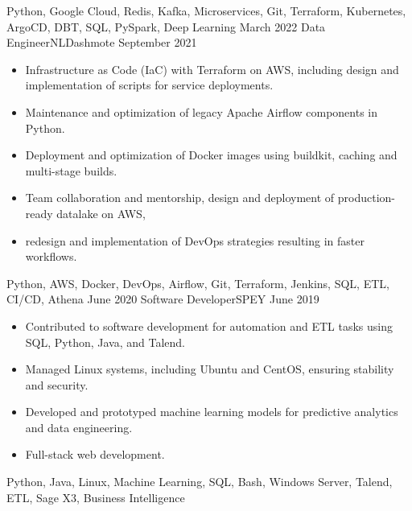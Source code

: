 \begin{experiences}
{\begin{itemize}
    \end{itemize}
  }
  {Python, Google Cloud, Redis, Kafka, Microservices, Git, Terraform, Kubernetes, ArgoCD, DBT, SQL, PySpark, Deep Learning}
  \emptySeparator
  \experience
  {March 2022}   {Data Engineer}{NL}{Dashmote}
  {September 2021} {
    \begin{itemize}
      \item Infrastructure as Code (IaC) with Terraform on AWS, including design and implementation of scripts for service deployments.
      \item Maintenance and optimization of legacy Apache Airflow components in Python.
      \item Deployment and optimization of Docker images using buildkit, caching and multi-stage builds.
      \item Team collaboration and mentorship, design and deployment of production-ready datalake on AWS,
      \item redesign and implementation of DevOps strategies resulting in faster workflows.

    \end{itemize}
  }
  {Python, AWS, Docker, DevOps, Airflow, Git, Terraform, Jenkins, SQL, ETL, CI/CD, Athena}
  \emptySeparator
  \experience
  {June 2020}   {Software Developer}{SP}{EY}
  {June 2019} {
    \begin{itemize}
      \item Contributed to software development for automation and ETL tasks using SQL, Python, Java, and Talend.
      \item Managed Linux systems, including Ubuntu and CentOS, ensuring stability and security.
      \item Developed and prototyped machine learning models for predictive analytics and data engineering.
      \item Full-stack web development.
    \end{itemize}
  }
  {Python, Java, Linux, Machine Learning, SQL, Bash, Windows Server, Talend, ETL, Sage X3, Business Intelligence}
  \emptySeparator
\end{experiences}
